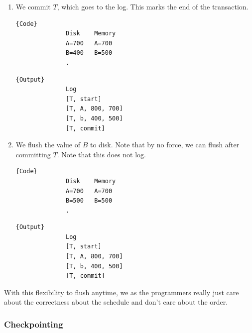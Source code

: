 \begin{example}
\begin{enumerate}
        \item We commit $T$, which goes to the log. This marks the end of the transaction. 

          \noindent\begin{minipage}{.46\textwidth}
            \begin{lstlisting}[]{Code}
              Disk    Memory
              A=700   A=700
              B=400   B=500
              .
            \end{lstlisting}
            \end{minipage}
            \hfill
            \begin{minipage}{.45\textwidth}
            \begin{lstlisting}[]{Output}
              Log 
              [T, start]
              [T, A, 800, 700]
              [T, b, 400, 500] 
              [T, commit]
            \end{lstlisting}
          \end{minipage} 

        \item We flush the value of $B$ to disk. Note that by no force, we can flush after committing $T$. Note that this does not log. 

          \noindent\begin{minipage}{.46\textwidth}
            \begin{lstlisting}[]{Code}
              Disk    Memory
              A=700   A=700
              B=500   B=500
              .
            \end{lstlisting}
            \end{minipage}
            \hfill
            \begin{minipage}{.45\textwidth}
            \begin{lstlisting}[]{Output}
              Log 
              [T, start]
              [T, A, 800, 700]
              [T, b, 400, 500] 
              [T, commit]
            \end{lstlisting}
          \end{minipage} 

      \end{enumerate}
    \end{example}

    With this flexibility to flush anytime, we as the programmers really just care about the correctness about the schedule and don't care about the order.  

  \subsubsection{Checkpointing} 
    
